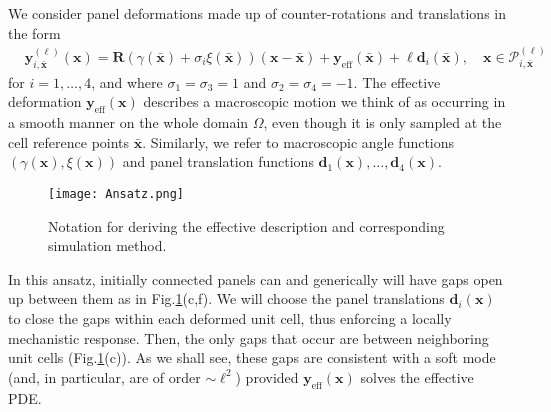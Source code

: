 \documentclass[aps,11pt,tightenlines,notitlepage,superscriptaddress,longbibliography,nofootinbib]{revtex4-1}
\begin{document}
We consider panel deformations made up of counter-rotations and translations in the form
\begin{equation}
\begin{aligned}\label{eq:ansatzRigid}
&\mathbf{y}_{i,\bar{\mathbf{x}}}^{(\ell)}(\mathbf{x}) = \mathbf{R}(\gamma(\bar{\mathbf{x}}) + \sigma_i \xi(\bar{\mathbf{x}})) (\mathbf{x} - \bar{\mathbf{x}}) + \mathbf{y}_{\text{eff}}(\bar{\mathbf{x}}) + \ell \mathbf{d}_i(\bar{\mathbf{x}}),\quad \mathbf{x} \in \mathcal{P}_{i,\bar{\mathbf{x}}}^{(\ell)}
\end{aligned}
\end{equation} 
for $i = 1,\ldots,4$, and where $\sigma_1 = \sigma_3 = 1$ and $\sigma_2 = \sigma_4 = -1$. The effective deformation $\mathbf{y}_\text{eff}(\mathbf{x})$ describes a macroscopic motion we think of as occurring in a smooth manner on the whole domain $\Omega$, even though it is only sampled at the cell reference points $\bar{\mathbf{x}}$. Similarly, we refer to macroscopic angle functions $(\gamma(\mathbf{x}), \xi(\mathbf{x}))$ and panel translation functions $\mathbf{d}_1(\mathbf{x}), \ldots, \mathbf{d}_4(\mathbf{x})$.   %
\begin{figure}[t]
\centering
\texttt{[image: Ansatz.png]}
\caption{Notation for deriving the effective description and corresponding simulation method.}
\label{fig:Ansatz}
\end{figure}
In this ansatz, initially connected panels can and generically will have gaps open up between them as in Fig.\;\ref{fig:Ansatz}(c,f). We will choose the panel translations $\mathbf{d}_i(\mathbf{x})$ to close the gaps within each deformed unit cell, thus enforcing a locally mechanistic response. Then, the only gaps that occur are between neighboring unit cells (Fig.\;\ref{fig:Ansatz}(c)). As we shall see, these gaps are consistent with a soft mode (and, in particular, are of order $\sim\ell^2$) provided $\mathbf{y}_\text{eff}(\mathbf{x})$ solves the effective PDE.
\end{document}
